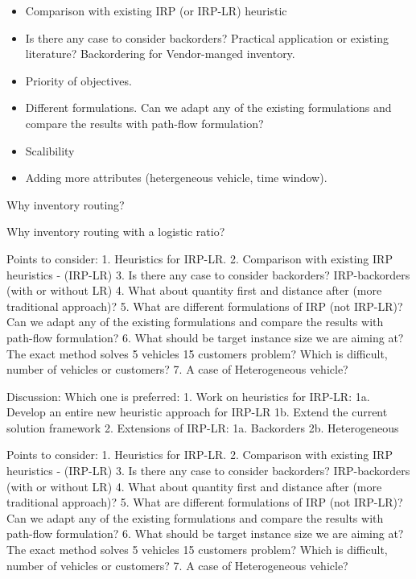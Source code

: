 \documentclass{article}
\begin{document}
\begin{itemize}
    \item Comparison with existing IRP (or IRP-LR) heuristic
    \item Is there any case to consider backorders? Practical application or existing literature? Backordering for Vendor-manged inventory.
    \item Priority of objectives.
    \item Different formulations. Can we adapt any of the existing formulations and compare the results with path-flow formulation?
    \item Scalibility
    \item Adding more attributes (hetergeneous vehicle, time window).
\end{itemize}



\noindent Why inventory routing? \cite{archetti2016inventory}

\noindent Why inventory routing with a logistic ratio? \cite{archetti2017minimizing}


Points to consider:
1. Heuristics for IRP-LR.  
2. Comparison with existing IRP heuristics - (IRP-LR) 
3. Is there any case to consider backorders? IRP-backorders (with or without LR)
4. What about quantity first and distance after (more traditional approach)?
5. What are different formulations of IRP (not IRP-LR)? Can we adapt any of the existing formulations and compare the results with path-flow formulation? 
6. What should be target instance size we are aiming at? The exact method solves 5 vehicles 15 customers problem? Which is difficult, number of vehicles or customers?
7. A case of Heterogeneous vehicle?


Discussion: 
Which one is preferred: 
 1. Work on heuristics for IRP-LR: 
    1a. Develop an entire new heuristic approach for IRP-LR
    1b. Extend the current solution framework
 2. Extensions of IRP-LR:
    1a. Backorders
    2b. Heterogeneous 




Points to consider:
1. Heuristics for IRP-LR.  
2. Comparison with existing IRP heuristics - (IRP-LR) 
3. Is there any case to consider backorders? IRP-backorders (with or without LR)
4. What about quantity first and distance after (more traditional approach)?
5. What are different formulations of IRP (not IRP-LR)? Can we adapt any of the existing formulations and compare the results with path-flow formulation? 
6. What should be target instance size we are aiming at? The exact method solves 5 vehicles 15 customers problem? Which is difficult, number of vehicles or customers?
7. A case of Heterogeneous vehicle?
\end{document}
